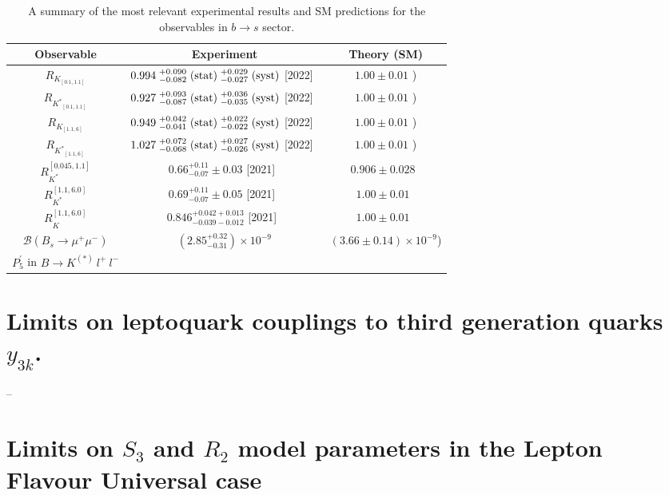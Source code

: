 \documentclass[12pt]{revtex4-2}
\numberwithin{equation}{section}
\begin{document}
\begin{table*}[!h]
\begin{center}
\renewcommand{\arraystretch}{1.5}
\begin{tabular}{|c|c|c|}
     \hline
     Observable & Experiment & Theory (SM) \\
     \hline
     $R_{K_{[0.1,1.1]}}$ & $0.994\;^{+0.090}_{-0.082}\;({\rm stat})\;^{+0.029}_{-0.027}\;({\rm syst})$ [2022]~\cite{LHCb:2022qnv,LHCb:2022zom} &  $1.00\pm0.01$  \cite{Bordone:2016gaq}) \\
     $R_{{K^{*}}_{[0.1,1.1]}}$ & $0.927\;^{+0.093}_{-0.087}\;({\rm stat})\;^{+0.036}_{-0.035}\;({\rm syst})$ [2022]~\cite{LHCb:2022qnv,LHCb:2022zom} & $1.00\pm0.01$ \cite{Bordone:2016gaq}) \\
     $R_{K_{[1.1,6]}}$ & $0.949\;^{+0.042}_{-0.041}\;({\rm stat})\;^{+0.022}_{-0.022}\;({\rm syst})$
     [2022]~\cite{LHCb:2022qnv,LHCb:2022zom} & $1.00\pm0.01$ \cite{Bordone:2016gaq}) \\ 
      $R_{{K^{*}}_{[1.1,6]}}$ & $1.027\;^{+0.072}_{-0.068}\;({\rm stat})\;^{+0.027}_{-0.026}\;({\rm syst})$ 
     [2022]~\cite{LHCb:2022qnv,LHCb:2022zom} & $1.00\pm0.01$ \cite{Bordone:2016gaq}) \\
      \hline
      $R_{K^*}^{[0.045,1.1]}$ &     $0.66^{+0.11}_{-0.07}\pm0.03$ [2021]~\cite{LHCb:2017avl}   &   $0.906\pm0.028$~\cite{Bordone:2016gaq} \\[5pt]  
      $R_{K^*}^{[1.1,6.0]} $   &     $0.69^{+0.11}_{-0.07}\pm0.05$ [2021]~\cite{LHCb:2017avl}   &   $1.00\pm0.01$~\cite{Bordone:2016gaq}  \\[5pt] 
     $R_{K^{\phantom{*}}}^{[1.1,6.0]}$  &    $0.846^{+0.042+0.013}_{-0.039-0.012}$ [2021]~\cite{LHCb:2021trn}    &   $1.00\pm0.01$~\cite{Bordone:2016gaq} \\[2pt] 
    \hline
     $\mathcal{B}(B_s \rightarrow \mu^+ \mu^-)$ &  $(2.85^{+0.32}_{-0.31}) \times 10^{-9}$ \cite{ATLAS:2018cur, CMS:2019bbr} & $(3.66\pm0.14)\times 10^{-9}$\cite{Beneke:2019slt}) \\
     $P^\prime_5$ in \mbox{$B \rightarrow K^{(*)} \ l^+ \ l^- $} & \cite{LHCb:2013ghj, LHCb:2015svh, LHCb:2020gog} & \cite{Descotes-Genon:2013vna,Gubernari:2022hxn}\\
     \hline
\end{tabular}
\end{center}
\caption{A summary of the most relevant experimental results and SM predictions for the observables in $b \rightarrow s$ sector.}
\label{tab:bslldata}
\end{table*} 

\newpage

\section{Limits on leptoquark couplings to third generation quarks $y_{3k}$.}



\newpage
--
\newpage
\section{Limits on $S_3$ and $R_2$ model parameters in the Lepton Flavour Universal case}
\label{app:emulimits}
\end{document}
